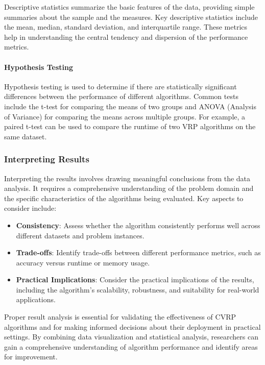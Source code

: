 \documentclass{article}
\begin{document}
    Descriptive statistics summarize the basic features of the data, providing simple summaries about the sample and the measures. Key descriptive statistics include the mean, median, standard deviation, and interquartile range. These metrics help in understanding the central tendency and dispersion of the performance metrics.

    \paragraph{Hypothesis Testing}

    Hypothesis testing is used to determine if there are statistically significant differences between the performance of different algorithms. Common tests include the t-test for comparing the means of two groups and ANOVA (Analysis of Variance) for comparing the means across multiple groups. For example, a paired t-test can be used to compare the runtime of two VRP algorithms on the same dataset.

    \subsubsection{Interpreting Results}

    Interpreting the results involves drawing meaningful conclusions from the data analysis. It requires a comprehensive understanding of the problem domain and the specific characteristics of the algorithms being evaluated. Key aspects to consider include:

    \begin{itemize}
        \item \textbf{Consistency}: Assess whether the algorithm consistently performs well across different datasets and problem instances.
        \item \textbf{Trade-offs}: Identify trade-offs between different performance metrics, such as accuracy versus runtime or memory usage.
        \item \textbf{Practical Implications}: Consider the practical implications of the results, including the algorithm's scalability, robustness, and suitability for real-world applications.
    \end{itemize}

    Proper result analysis is essential for validating the effectiveness of CVRP algorithms and for making informed decisions about their deployment in practical settings. By combining data visualization and statistical analysis, researchers can gain a comprehensive understanding of algorithm performance and identify areas for improvement. \cite{staegemann2024}
\end{document}
